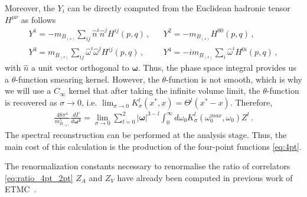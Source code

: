Moreover, the $Y_i$ can be directly computed from the Euclidean
hadronic tensor $H^{\mu\nu}$ as follows
\begin{align}
                                                     & Y^1=-m_{B_{(s)}}\sum_{ij}\hat{n}^i\hat{n}^j H^{ij}(p,q)\,,          &  & Y^2=-m_{B_{(s)}}H^{00}(p,q)\,, \\
                                                     & Y^3=m_{B_{(s)}}\sum_{ij}\hat{\omega}^i\hat{\omega}^j H^{ij}(p,q)\,, &  &
  Y^4=-im_{B_{(s)}}\sum_{i}\hat{\omega}^i H^{0i}(p,q)\,, &
\end{align}
with $\hat{n}$ a unit vector orthogonal to $\bm\omega$.
Thus, the phase space integral provides us a $\theta$-function smearing
kernel. However, the $\theta$-function is not smooth, which is why we
will use a $C_\infty$ kernel that
after taking the infinite volume limit, the
$\theta$-function is recovered as $\sigma\to0$, i.e. $\lim_{\sigma\to 0} K_\sigma^l(x^*,x)=\Theta^l(x^*-x)$.
Therefore,
\begin{gather}
  \frac{48 \pi^4}{m_{B_{(s)}}^5}\frac{d\Gamma}{d \bm{ \omega^2} }
  =\lim_{\sigma\to 0}\sum_{l=0}^2 |\bm{\omega}|^{3-l}\int_0^{\infty}d \omega_0 K_\sigma^l(\omega_0^{max},\omega_0) Z^l\,.
\end{gather}
The spectral reconstruction can be performed at the analysis stage. Thus,
the main cost of this calculation is the production of the
four-point functions \eqref{eq:4pt}.

The renormalization constants necessary to renormalise the ratio of
correlators \eqref{eq:ratio_4pt_2pt} $Z_A$ and $Z_V$ have already been
computed in previous work of ETMC~\cite{ExtendedTwistedMass:2024myu}.

